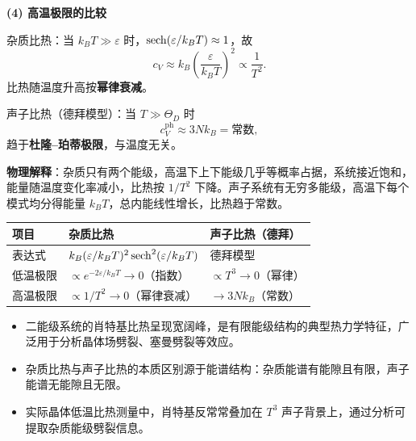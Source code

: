 \begin{derivationbox}[标准解题过程]
\textbf{(4) 高温极限的比较}

杂质比热：当 $k_BT\gg\varepsilon$ 时，$\sech(\varepsilon/k_BT)\approx1$，故
\begin{equation}
c_V\approx k_B\left(\frac{\varepsilon}{k_BT}\right)^2\propto\frac{1}{T^2}.
\end{equation}
比热随温度升高按\textbf{幂律衰减}。

声子比热（德拜模型）：当 $T\gg\Theta_D$ 时
\begin{equation}
c_V^{\text{ph}}\approx3Nk_B=\text{常数},
\end{equation}
趋于\textbf{杜隆--珀蒂极限}，与温度无关。

\textbf{物理解释}：杂质只有两个能级，高温下上下能级几乎等概率占据，系统接近饱和，能量随温度变化率减小，比热按 $1/T^2$ 下降。声子系统有无穷多能级，高温下每个模式均分得能量 $k_BT$，总内能线性增长，比热趋于常数。
\end{derivationbox}

\begin{formulabox}[答案汇总]
\begin{center}
\begin{tabular}{lll}
\toprule
\textbf{项目} & \textbf{杂质比热} & \textbf{声子比热（德拜）} \\
\midrule
表达式 & $k_B(\varepsilon/k_BT)^2\sech^2(\varepsilon/k_BT)$ & 德拜模型 \\
低温极限 & $\propto e^{-2\varepsilon/k_BT}\to0$（指数） & $\propto T^3\to0$（幂律） \\
高温极限 & $\propto1/T^2\to0$（幂律衰减） & $\to3Nk_B$（常数） \\
\bottomrule
\end{tabular}
\end{center}
\end{formulabox}

\begin{insightbox}[物理图像]
\begin{itemize}
    \item 二能级系统的肖特基比热呈现宽阔峰，是有限能级结构的典型热力学特征，广泛用于分析晶体场劈裂、塞曼劈裂等效应。
    \item 杂质比热与声子比热的本质区别源于能谱结构：杂质能谱有能隙且有限，声子能谱无能隙且无限。
    \item 实际晶体低温比热测量中，肖特基反常常叠加在 $T^3$ 声子背景上，通过分析可提取杂质能级劈裂信息。
\end{itemize}
\end{insightbox}
